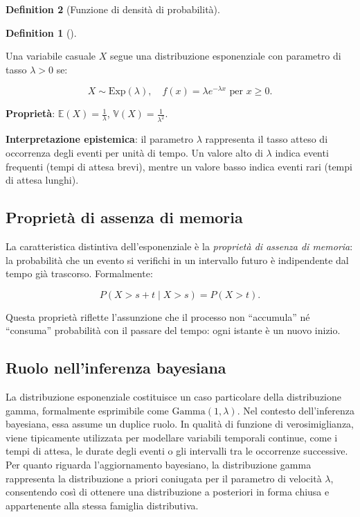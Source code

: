 \documentclass[
  letterpaper,
  DIV=11,
  numbers=noendperiod,
  oneside]{scrreprt}
\theoremstyle{definition}
\theoremstyle{plain}
\theoremstyle{definition}
\newtheorem{definition}{Definition}[chapter]
\theoremstyle{remark}
\begin{document}
\begin{definition}[Funzione di densità di
probabilità]
\begin{definition}[]\protect\hypertarget{def-exponential}{}\label{def-exponential}

Una variabile casuale \(X\) segue una distribuzione esponenziale con
parametro di tasso \(\lambda > 0\) se:

\[
X \sim \text{Exp}(\lambda), \quad f(x) = \lambda e^{-\lambda x} \text{ per } x \geq 0.
\]

\textbf{Proprietà}: \(\mathbb{E}(X) = \frac{1}{\lambda}\),
\(\mathbb{V}(X) = \frac{1}{\lambda^2}\).

\end{definition}

\textbf{Interpretazione epistemica}: il parametro \(\lambda\)
rappresenta il tasso atteso di occorrenza degli eventi per unità di
tempo. Un valore alto di \(\lambda\) indica eventi frequenti (tempi di
attesa brevi), mentre un valore basso indica eventi rari (tempi di
attesa lunghi).

\subsection{Proprietà di assenza di
memoria}\label{proprietuxe0-di-assenza-di-memoria}

La caratteristica distintiva dell'esponenziale è la \emph{proprietà di
assenza di memoria}: la probabilità che un evento si verifichi in un
intervallo futuro è indipendente dal tempo già trascorso. Formalmente:

\[
P(X > s + t \mid X > s) = P(X > t).
\]

Questa proprietà riflette l'assunzione che il processo non ``accumula''
né ``consuma'' probabilità con il passare del tempo: ogni istante è un
nuovo inizio.

\subsection{Ruolo nell'inferenza
bayesiana}\label{ruolo-nellinferenza-bayesiana-6}

La distribuzione esponenziale costituisce un caso particolare della
distribuzione gamma, formalmente esprimibile come
\(\text{Gamma}(1, \lambda)\). Nel contesto dell'inferenza bayesiana,
essa assume un duplice ruolo. In qualità di funzione di verosimiglianza,
viene tipicamente utilizzata per modellare variabili temporali continue,
come i tempi di attesa, le durate degli eventi o gli intervalli tra le
occorrenze successive. Per quanto riguarda l'aggiornamento bayesiano, la
distribuzione gamma rappresenta la distribuzione a priori coniugata per
il parametro di velocità \(\lambda\), consentendo così di ottenere una
distribuzione a posteriori in forma chiusa e appartenente alla stessa
famiglia distributiva.


\end{definition}
\end{document}

